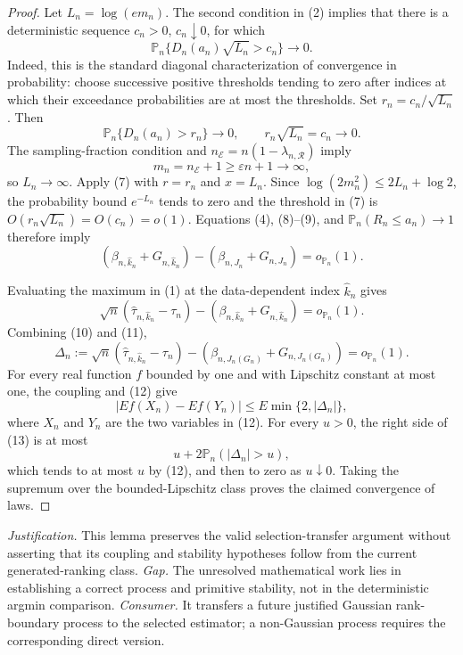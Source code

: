 \documentclass{article}
\begin{document}
\begin{proof}
Let \(L_n=\log(em_n)\).  The second condition in (2) implies that there is a deterministic sequence \(c_n>0\), \(c_n\downarrow0\), for which
\[
 \mathbb P_n\{D_n(a_n)\sqrt{L_n}>c_n\}\longrightarrow0. \tag{8}
\]
Indeed, this is the standard diagonal characterization of convergence in probability: choose successive positive thresholds tending to zero after indices at which their exceedance probabilities are at most the thresholds.  Set \(r_n=c_n/\sqrt{L_n}\).  Then
\[
 \mathbb P_n\{D_n(a_n)>r_n\}\longrightarrow0,
 \qquad
 r_n\sqrt{L_n}=c_n\longrightarrow0. \tag{9}
\]
The sampling-fraction condition and \(n_{\mathcal E}=n(1-\lambda_{n,\mathcal R})\) imply
\[
 m_n=n_{\mathcal E}+1\geq\varepsilon n+1\longrightarrow\infty,
\]
so \(L_n\to\infty\).  Apply (7) with \(r=r_n\) and \(x=L_n\).  Since \(\log(2m_n^2)\leq2L_n+\log2\), the probability bound \(e^{-L_n}\) tends to zero and the threshold in (7) is \(O(r_n\sqrt{L_n})=O(c_n)=o(1)\).  Equations (4), (8)--(9), and \(\mathbb P_n(R_n\leq a_n)\to1\) therefore imply
\[
 (\beta_{n,\widehat k_n}+G_{n,\widehat k_n})
 -(\beta_{n,J_n}+G_{n,J_n})=o_{\mathbb P_n}(1). \tag{10}
\]

Evaluating the maximum in (1) at the data-dependent index \(\widehat k_n\) gives
\[
 \sqrt n(\widehat\tau_{n,\widehat k_n}-\tau_n)
 -(\beta_{n,\widehat k_n}+G_{n,\widehat k_n})
 =o_{\mathbb P_n}(1). \tag{11}
\]
Combining (10) and (11),
\[
 \Delta_n:=
 \sqrt n(\widehat\tau_{n,\widehat k_n}-\tau_n)
 -(\beta_{n,J_n(G_n)}+G_{n,J_n(G_n)})
 =o_{\mathbb P_n}(1). \tag{12}
\]
For every real function \(f\) bounded by one and with Lipschitz constant at most one, the coupling and (12) give
\[
 \left|E f(X_n)-E f(Y_n)\right|
 \leq E\min\{2,|\Delta_n|\}, \tag{13}
\]
where \(X_n\) and \(Y_n\) are the two variables in (12).  For every \(u>0\), the right side of (13) is at most
\[
 u+2\mathbb P_n(|\Delta_n|>u),
\]
which tends to at most \(u\) by (12), and then to zero as \(u\downarrow0\).  Taking the supremum over the bounded-Lipschitz class proves the claimed convergence of laws.
\end{proof}
\par\smallskip\noindent \textit{Justification.} This lemma preserves the valid selection-transfer argument without asserting that its coupling and stability hypotheses follow from the current generated-ranking class. \textit{Gap.} The unresolved mathematical work lies in establishing a correct process and primitive stability, not in the deterministic argmin comparison. \textit{Consumer.} It transfers a future justified Gaussian rank-boundary process to the selected estimator; a non-Gaussian process requires the corresponding direct version.
\end{document}
